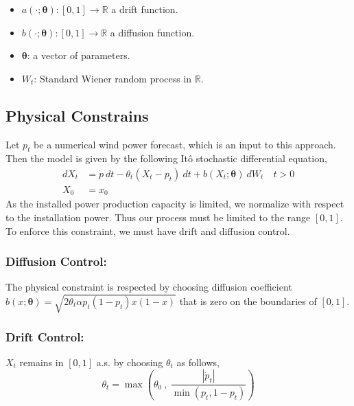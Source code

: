 \documentclass[ima, 20pt, portrait, plainboxedsections]{sciposter}
\newcommand{\R}{\mathbb{R}}
\begin{document}
\begin{multicols}{3}
\begin{itemize}
\item $a(\cdot; \bm{\theta}):[0,1] \to \R $  a drift function.
\item $b (\cdot; \bm{\theta} ):[0,1] \to \R$  a  diffusion function.
\item $\bm{\theta}$: a vector of parameters.
\item $W_t$: Standard Wiener random process in $\R$.
\end{itemize}

\subsection*{Physical Constrains}
Let $p_t$ be a numerical wind power forecast, which is an input to this approach. Then the model is given by the following It\^{o} stochastic differential equation,
\begin{equation}
\begin{split}
dX_t&= \dot{p} \ dt - \theta_t( X_t- p_t) \ dt + b (X_t; \bm{\theta} ) \ dW_t \quad t > 0 \\
X_0&=x_0
\end{split}
\end{equation}
As the  installed power production capacity is limited, we normalize with respect to the installation power. Thus our process must be limited to the range $[0,1]$. To enforce this constraint, we must have drift and diffusion control.
\subsubsection*{Diffusion Control: } The physical constraint is respected  by choosing  diffusion coefficient $ b (x; \bm{\theta} )= \sqrt{2 \theta_t \alpha p_t(1-p_t) x (1-x)} $ that is zero on the boundaries of $[0,1]$.
\subsubsection*{Drift Control: }
$X_t$ remains in $[0,1]$ a.s. by choosing $\theta_t$ as follows, 
\begin{equation}
\theta_t = \max \left( \theta_0 \ , \ \frac{|\dot{p}_t|}{\min (p_t, 1-p_t)}  \right )
\end{equation}


\end{multicols}
\end{document}
